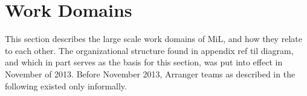 

\section{Work Domains}
\label{sec:work_domains}
This section describes the large scale work domains of MiL, and how they relate to each other. The organizational structure found in appendix ref til diagram, and which in part serves as the basis for this section, was put into effect in November of 2013. Before November 2013, Arranger teams as described in the following existed only informally.
